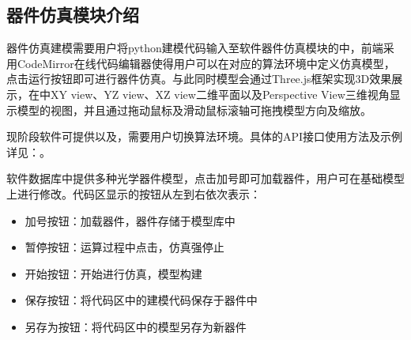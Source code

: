 \documentclass[a4paper,10pt,english]{sphinxmanual}
\begin{document}
{{\subsection{器件仿真模块介绍}
\label{\detokenize{_u8f6f_u4ef6_u6a21_u5757_u4ecb_u7ecd/_u5668_u4ef6_u4eff_u771f/contents:id2}}
\sphinxAtStartPar
器件仿真建模需要用户将python建模代码输入至软件器件仿真模块的中，前端采用CodeMirror在线代码编辑器使得用户可以在对应的算法环境中定义仿真模型，点击运行按钮即可进行器件仿真。与此同时模型会通过Three.js框架实现3D效果展示，在中XY view、YZ view、XZ view二维平面以及Perspective View三维视角显示模型的视图，并且通过拖动鼠标及滑动鼠标滚轴可拖拽模型方向及缩放。


\sphinxAtStartPar
{}





\sphinxAtStartPar
现阶段软件可提供以及，需要用户切换算法环境。具体的API接口使用方法及示例详见：。

\sphinxAtStartPar
软件数据库中提供多种光学器件模型，点击加号即可加载器件，用户可在基础模型上进行修改。代码区显示的按钮从左到右依次表示：
\begin{itemize}
\item {} 
\sphinxAtStartPar
加号按钮：加载器件，器件存储于模型库中

\item {} 
\sphinxAtStartPar
暂停按钮：运算过程中点击，仿真强停止

\item {} 
\sphinxAtStartPar
开始按钮：开始进行仿真，模型构建

\item {} 
\sphinxAtStartPar
保存按钮：将代码区中的建模代码保存于器件中

\item {} 
\sphinxAtStartPar
另存为按钮：将代码区中的模型另存为新器件

\end{itemize}

}}
\end{document}
